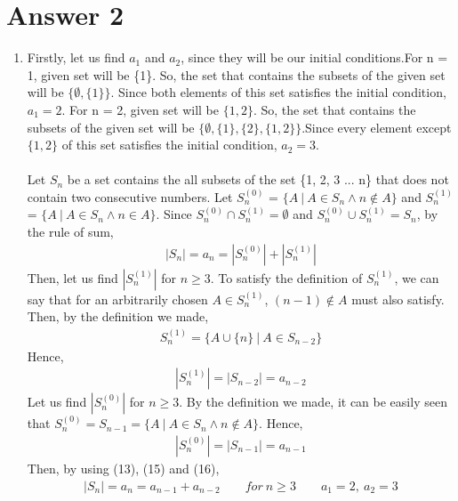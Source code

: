 \documentclass[12pt]{article}
\begin{document}
\section*{Answer 2}
\renewcommand{\theenumi}{\alph{enumi}}
\begin{enumerate}
\item 
Firstly, let us find $a_{1}$ and $a_{2}$, since they will be our initial conditions.For n = 1, given set will be \{1\}. So, the set that contains the subsets of the given set will be $\{\emptyset, \{1\}\}$. Since both elements of this set satisfies the initial condition, $a_{1} = 2$. For n = 2, given set will be $\{1,2\}$. So, the set that contains the subsets of the given set will be $\{\emptyset, \{1\}, \{2\}, \{1,2\} \}$.Since every element except $\{1,2\}$ of this set satisfies the initial condition, $a_{2} = 3$.
\\ \\
Let $S_{n}$ be a set contains the all subsets of the set \{1, 2, 3 ... n\} that does not contain two consecutive numbers.
Let $S_{n}^{(0)}$ = $\{A \ | \ A\in S_{n}\land n\notin A\}$ and $S_{n}^{(1)}$ = $\{A \ | \ A\in S_{n}\land n\in A\}$. Since $S_{n}^{(0)}\cap S_{n}^{(1)} = \emptyset$ and $S_{n}^{(0)}\cup S_{n}^{(1)} = S_{n}$, by the rule of sum,
\begin{equation}
\begin{split}
|S_{n}| = a_{n} = |S_{n}^{(0)}|+|S_{n}^{(1)}|
\end{split}
\end{equation}
Then, let us find $|S_{n}^{(1)}|$ for $n \geq 3$. To satisfy the definition of $S_{n}^{(1)}$, we can say that for an arbitrarily chosen $A\in S_{n}^{(1)}$, $(n-1)\notin A$ must also satisfy. Then, by the definition we made,
\begin{equation}
\begin{split}
S_{n}^{(1)} = \{A \cup \{n\} \ | \ A\in S_{n-2} \}
\end{split}
\end{equation}
Hence, 
\begin{equation}
\begin{split}
|S_{n}^{(1)}| = |S_{n-2}| = a_{n-2}
\end{split}
\end{equation}
Let us find $|S_{n}^{(0)}|$ for $n \geq 3$.
By the definition we made, it can be easily seen that $S_{n}^{(0)} = S_{n-1} = \{A \ | \ A\in S_{n}\land n\notin A\}$. Hence, 
\begin{equation}
\begin{split}
|S_{n}^{(0)}| = |S_{n-1}| = a_{n-1}
\end{split}
\end{equation}
Then, by using (13), (15) and (16), 
\begin{equation}
\begin{split}
|S_{n}| = a_{n} = a_{n-1} + a_{n-2} \qquad  for \ n \geq 3 \qquad a_{1}=2,\ a_{2}=3
\end{split}
\end{equation}




\end{enumerate}
\end{document}
